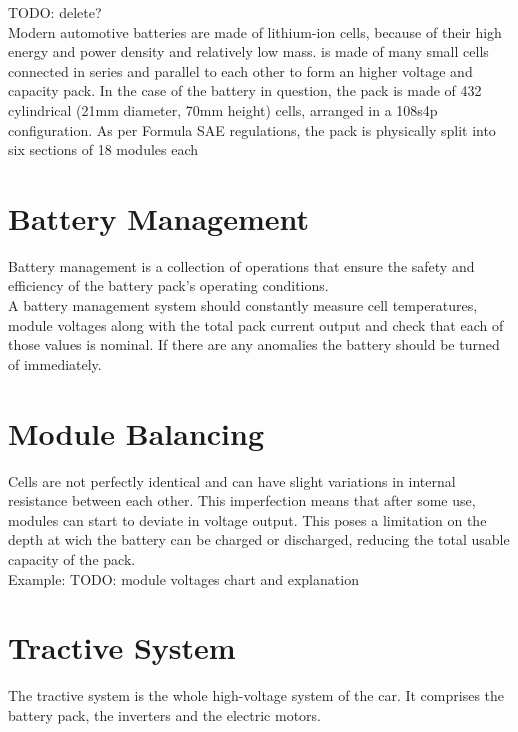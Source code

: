 TODO: delete?\\
Modern automotive batteries are made of lithium-ion cells, because of their high energy and power density and relatively low mass.
is made of many small cells connected in series and parallel to each other to form an higher voltage and capacity pack. In the case of the battery in question, the pack is made of 432 cylindrical (21mm diameter, 70mm height) cells, arranged in a 108s4p configuration. As per Formula SAE regulations, the pack is physically split into six sections of 18 modules each

\section{Battery Management}
Battery management is a collection of operations that ensure the safety and efficiency of the battery pack's operating conditions.\\
A battery management system should constantly measure cell temperatures, module voltages along with the total pack current output and check that each of those values is nominal. If there are any anomalies the battery should be turned of immediately.


\section {Module Balancing}
Cells are not perfectly identical and can have slight variations in internal resistance between each other. This imperfection means that after some use, modules can start to deviate in voltage output. This poses a limitation on the depth at wich the battery can be charged or discharged, reducing the total usable capacity of the pack.\\
Example:
TODO: module voltages chart and explanation

\section{Tractive System}
The tractive system is the whole high-voltage system of the car. It comprises the battery pack, the inverters and the electric motors.

